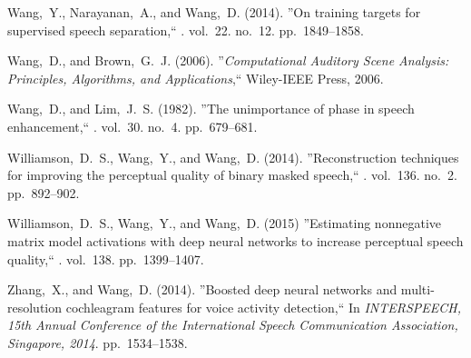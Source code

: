  Wang,~Y., Narayanan,~A., and Wang,~D. (2014). \newblock
''On training targets for supervised speech separation,`` . vol.~22. no.~12. pp.~1849--1858.

 Wang,~D., and Brown,~G.~J. (2006). \newblock
''{\em Computational Auditory Scene Analysis: Principles, Algorithms, and
Applications},`` \newblock Wiley-IEEE Press, 2006.

 Wang,~D., and Lim,~J.~S. (1982). \newblock ''The
unimportance of phase in speech enhancement,`` . vol.~30. no.~4. pp.~679--681.

 Williamson,~D.~S., Wang,~Y., and
Wang,~D. (2014). \newblock ''Reconstruction techniques for improving the perceptual
quality of binary masked speech,`` . vol.~136. no.~2. pp.~892--902.

 Williamson,~D.~S., Wang,~Y., and
Wang,~D. (2015) \newblock ''Estimating nonnegative matrix model activations with deep neural networks to increase
perceptual speech quality,`` . vol.~138. pp.~1399--1407.

%
 Zhang,~X., and Wang,~D. (2014). \newblock
''Boosted deep neural networks and multi-resolution cochleagram features for voice
activity detection,`` \newblock In {\em {INTERSPEECH}, 15th Annual Conference of the International Speech Communication Association, Singapore, 2014}. pp.~1534--1538.
  